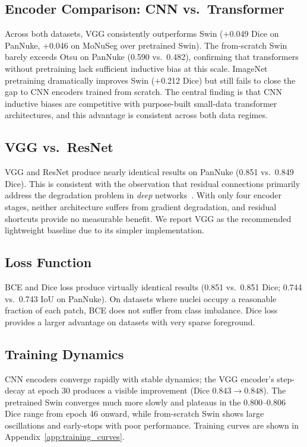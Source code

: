 \documentclass{article}
\begin{document}
\subsection{Encoder Comparison: CNN vs.\ Transformer}

Across both datasets, VGG consistently outperforms Swin ($+$0.049 Dice on PanNuke, $+$0.046 on MoNuSeg over pretrained Swin). The from-scratch Swin barely exceeds Otsu on PanNuke (0.590 vs.\ 0.482), confirming that transformers without pretraining lack sufficient inductive bias at this scale. ImageNet pretraining dramatically improves Swin ($+$0.212 Dice) but still fails to close the gap to CNN encoders trained from scratch. The central finding is that CNN inductive biases are competitive with purpose-built small-data transformer architectures, and this advantage is consistent across both data regimes.

\subsection{VGG vs.\ ResNet}

VGG and ResNet produce nearly identical results on PanNuke (0.851 vs.\ 0.849 Dice). This is consistent with the observation that residual connections primarily address the degradation problem in \emph{deep} networks~\cite{he2016resnet}. With only four encoder stages, neither architecture suffers from gradient degradation, and residual shortcuts provide no measurable benefit. We report VGG as the recommended lightweight baseline due to its simpler implementation.

\subsection{Loss Function}

BCE and Dice loss produce virtually identical results (0.851 vs.\ 0.851 Dice; 0.744 vs.\ 0.743 IoU on PanNuke). On datasets where nuclei occupy a reasonable fraction of each patch, BCE does not suffer from class imbalance. Dice loss provides a larger advantage on datasets with very sparse foreground.

\subsection{Training Dynamics}

CNN encoders converge rapidly with stable dynamics; the VGG encoder's step-decay at epoch 30 produces a visible improvement (Dice $0.843 \to 0.848$). The pretrained Swin converges much more slowly and plateaus in the 0.800--0.806 Dice range from epoch 46 onward, while from-scratch Swin shows large oscillations and early-stops with poor performance. Training curves are shown in Appendix~\ref{app:training_curves}.
\end{document}
